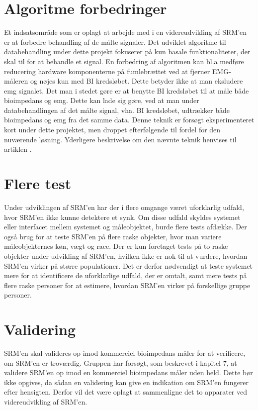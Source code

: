  
\section{Algoritme forbedringer}

Et indsatsområde som er oplagt at arbejde med i en videreudvikling af SRM'en er at forbedre behandling af de målte signaler. Det udviklet algoritme til databehandling under dette projekt fokuserer på kun basale funktionaliteter, der skal til for at behandle et signal. En forbedring af algoritmen kan bl.a medføre reducering hardware komponenterne på fumlebrættet ved at fjerner EMG-måleren og nøjes kun med BI kredsløbet. Dette betyder ikke at man eksludere emg signalet. Det man i stedet gøre er at benytte BI kredsløbet til at måle både bioimpedans og emg. Dette kan lade sig gøre, ved at man under databehandlingen af det målte signal, vha. BI kredsløbet, udtrækker både bioimpedans og emg  fra det samme data. Denne teknik er forsøgt eksperimenteret kort under dette projektet, men droppet efterfølgende til fordel for den nuværende løsning. Yderligere beskrivelse om den nævnte teknik henvises til artiklen  \cite{Nahrstaedt2012}.      

\section{Flere test}
Under udviklingen af  SRM'en har der i flere omgange været uforklarlig udfald, hvor SRM'en ikke kunne detektere et synk. Om disse udfald skyldes systemet eller interfacet mellem systemet og måleobjektet, burde flere tests afdække. Der også brug for at teste SRM'en på flere raske objekter, hvor man variere måleobjekternes køn, vægt og race. Der er kun foretaget tests på to raske objekter under udvikling af SRM'en, hvilken ikke er nok til at vurdere, hvordan SRM'en virker på større populationer. Det er derfor nødvendigt at teste systemet mere for at identificere de uforklarlige udfald, der er omtalt, samt mere tests på flere raske personer for at estimere, hvordan SRM'en virker på forskellige gruppe personer.  
 
 
\section{Validering}

SRM'en skal valideres op imod kommerciel bioimpedans måler for at verificere, om SRM'en er troværdig. Gruppen har forsøgt, som beskrevet i kapitel 7, at validere SRM'en op imod en kommerciel bioimpedans måler uden held. Dette bør ikke opgives, da sådan en validering kan give en indikation om SRM'en fungerer efter hensigten. Derfor vil det være oplagt at sammenligne det to apparater ved videreudvikling af SRM'en. 

